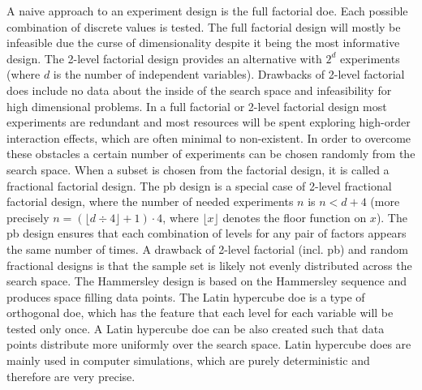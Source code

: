 A naive approach to an experiment design is the full factorial \gls{doe}.
Each possible combination of discrete values is tested.
The full factorial design will mostly be infeasible due the curse of dimensionality\cite{cherkassky1998learning} despite it being the most informative design.
The 2-level factorial design provides an alternative with $2^d$ experiments (where $d$ is the number of independent variables). 
Drawbacks of 2-level factorial \gls{doe}s include no data about the inside of the search space and infeasibility for high dimensional problems.
In a full factorial or 2-level factorial design most experiments are redundant and most resources will be spent exploring high-order interaction effects\cite{gunst2009fractional}, which are often minimal to non-existent.
In order to overcome these obstacles a certain number of experiments can be chosen randomly from the search space. 
When a subset is chosen from the factorial design, it is called a fractional factorial design. 
The \gls{pb}\cite{vanaja2007design,miller2001using,wang1995hidden} design is a special case of 2-level fractional factorial design, 
where the number of needed experiments $n$ is $n<d+4$ 
(more precisely $n=(\lfloor d\div4\rfloor+1)\cdot4$, where $\lfloor x\rfloor$ denotes the floor function on $x$).
The \gls{pb} design ensures that each combination of levels for any pair of factors appears the same number of times. 
A drawback of 2-level factorial (incl. \gls{pb}) and random fractional designs is that the sample set is likely not evenly distributed across the search space\cite{viana2016tutorial}. 
The Hammersley design\cite{viana2016tutorial,diwekar1997efficient} is based on the Hammersley sequence and produces space filling data points. 
The Latin hypercube \gls{doe}\cite{viana2016tutorial,diwekar1997efficient} is a type of orthogonal \gls{doe}, 
which has the feature that each level for each variable will be tested only once. 
A Latin hypercube \gls{doe} can be also created such that data points distribute more uniformly over the search space. 
Latin hypercube \gls{doe}s are mainly used in computer simulations, which are purely deterministic and therefore are very precise.
%
\iffalse
%


